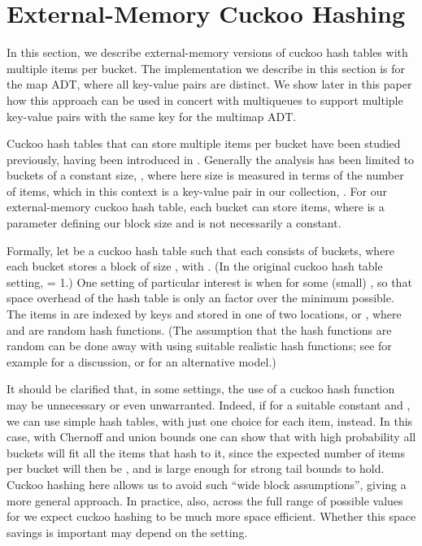 \documentclass[11pt,letterpaper]{article}
\begin{document}
\section{External-Memory Cuckoo Hashing}
\label{sec:map}
In this section, we describe external-memory
versions of cuckoo hash tables with multiple items per bucket.  
The implementation we describe in this section is for the map ADT,
where all key-value pairs are distinct. We show later in this paper
how this approach can be used in concert with multiqueues to support
multiple key-value pairs with the same key for the multimap ADT.

Cuckoo hash tables that can store multiple items per bucket have been
studied previously, having been introduced
in \cite{dw-badtpcs-07}.  Generally the analysis has been
limited to buckets of a constant size, , where here size is
measured in terms of the number of items, which in this context is a
key-value pair in our collection, .  For our external-memory cuckoo
hash table, each bucket can store  items, where  is a parameter defining our block size and is not necessarily a constant.

Formally, let  be a cuckoo hash table such that
each  consists of  buckets, where each bucket stores a
block of size , with .  (In the original cuckoo hash table setting,
 = 1.)  One setting of particular interest
is when  for some (small) , so
that space overhead of the hash table is only an  factor
over the minimum possible.  The items in  are indexed by keys
and stored in one of two locations,  or ,
where  and  are random hash functions.  (The assumption that
the hash functions are random can be done away with using suitable
realistic hash functions; see for
example \cite{dw-badtpcs-07} for a discussion,
or \cite{mv-wshfw-08} for an alternative model.)

It should be clarified that, in some settings, the use of a cuckoo
hash function may be unnecessary or even unwarranted.  Indeed, if  for a suitable constant  and , we
can use simple hash tables, with just one choice for each item,
instead.  In this case, with Chernoff and union bounds one can show
that with high probability all buckets will fit all the items that
hash to it, since the expected number of items per bucket will then be
, and  is large enough for strong tail bounds to
hold.  Cuckoo hashing here allows us to avoid such ``wide block
assumptions'', giving a more general approach.  In practice, also,
across the full range of possible values for  we expect cuckoo
hashing to be much more space efficient.  Whether this space savings
is important may depend on the setting.
\end{document}
